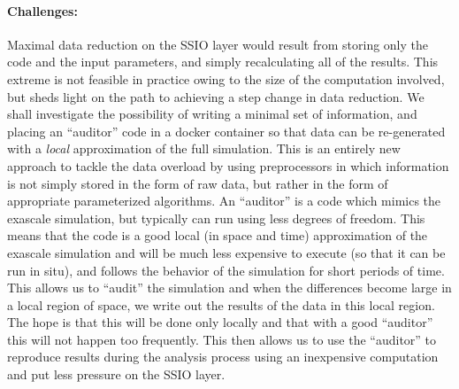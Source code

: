 \paragraph{Challenges:} Maximal data reduction on the SSIO layer
would result from storing only the code and the input parameters, and simply
recalculating all of the results. This extreme is not feasible in practice
owing to the size of the computation involved, but sheds light on the path to
achieving a step change in data reduction. We shall investigate the possibility
of writing a minimal set of information, and placing an ``auditor'' code in a
docker container so that data can be re-generated with a {\em local}
approximation of the full simulation. This is an entirely new approach to
tackle the data overload by using preprocessors in which information is not
simply stored in the form of raw data, but rather in the form of appropriate
parameterized algorithms. An ``auditor'' is a code which mimics the exascale simulation, 
but typically can run using less degrees of freedom. This means that the code is a good
local (in space and time) approximation of the exascale simulation and will be much less
expensive to execute (so that it can be run in situ), and follows the behavior of the simulation
for short periods of time. This allows us to ``audit'' the simulation and when the differences 
become large in a local region of space, we write out the results of the data in this local region.
The hope is that this will be done only locally and that with a good ``auditor''  this will not happen
too frequently. This then allows us to use the ``auditor'' to reproduce results during the analysis 
process using an inexpensive computation and put less pressure on the SSIO layer.
%
% 

